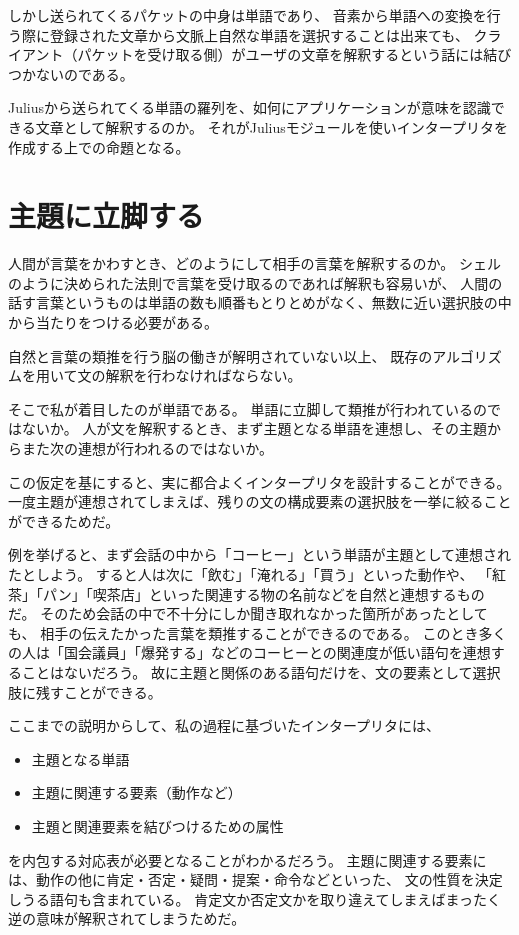 \documentclass{jsarticle}
\begin{document}
\begin{multicols}{2}
しかし送られてくるパケットの中身は単語であり、
音素から単語への変換を行う際に登録された文章から文脈上自然な単語を選択することは出来ても、
クライアント（パケットを受け取る側）がユーザの文章を解釈するという話には結びつかないのである。

Juliusから送られてくる単語の羅列を、如何にアプリケーションが意味を認識できる文章として解釈するのか。
それがJuliusモジュールを使いインタープリタを作成する上での命題となる。

\section{主題に立脚する}

人間が言葉をかわすとき、どのようにして相手の言葉を解釈するのか。
シェルのように決められた法則で言葉を受け取るのであれば解釈も容易いが、
人間の話す言葉というものは単語の数も順番もとりとめがなく、無数に近い選択肢の中から当たりをつける必要がある。

自然と言葉の類推を行う脳の働きが解明されていない以上、
既存のアルゴリズムを用いて文の解釈を行わなければならない。

そこで私が着目したのが単語である。
単語に立脚して類推が行われているのではないか。
人が文を解釈するとき、まず主題となる単語を連想し、その主題からまた次の連想が行われるのではないか。

この仮定を基にすると、実に都合よくインタープリタを設計することができる。
一度主題が連想されてしまえば、残りの文の構成要素の選択肢を一挙に絞ることができるためだ。

例を挙げると、まず会話の中から「コーヒー」という単語が主題として連想されたとしよう。
すると人は次に「飲む」「淹れる」「買う」といった動作や、
「紅茶」「パン」「喫茶店」といった関連する物の名前などを自然と連想するものだ。
そのため会話の中で不十分にしか聞き取れなかった箇所があったとしても、
相手の伝えたかった言葉を類推することができるのである。
このとき多くの人は「国会議員」「爆発する」などのコーヒーとの関連度が低い語句を連想することはないだろう。
故に主題と関係のある語句だけを、文の要素として選択肢に残すことができる。

ここまでの説明からして、私の過程に基づいたインタープリタには、
\begin{itemize}
\item 主題となる単語
\item 主題に関連する要素（動作など）
\item 主題と関連要素を結びつけるための属性
\end{itemize}
を内包する対応表が必要となることがわかるだろう。
主題に関連する要素には、動作の他に肯定・否定・疑問・提案・命令などといった、
文の性質を決定しうる語句も含まれている。
肯定文か否定文かを取り違えてしまえばまったく逆の意味が解釈されてしまうためだ。


\end{multicols}
\end{document}
